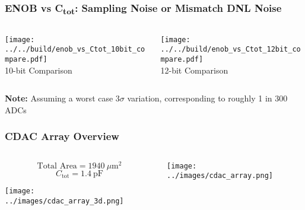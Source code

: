 \documentclass[aspectratio=169]{beamer}
\begin{document}
\begin{frame}
  \frametitle{ENOB vs C\textsubscript{tot}: Sampling Noise or Mismatch DNL Noise}

  \begin{columns}
    \begin{column}{0.5\textwidth}
      \begin{center}
        \texttt{[image: ../../build/enob\_vs\_Ctot\_10bit\_compare.pdf]}
        \\
        \small 10-bit Comparison
      \end{center}
    \end{column}
    \begin{column}{0.5\textwidth}
      \begin{center}
        \texttt{[image: ../../build/enob\_vs\_Ctot\_12bit\_compare.pdf]}
        \\
        \small 12-bit Comparison
      \end{center}
    \end{column}
  \end{columns}
  \begin{center}
    \small
    \textbf{Note:} Assuming a worst case $3\sigma$ variation, corresponding to roughly 1 in 300 ADCs
  \end{center}
\end{frame}





\begin{frame}
  \frametitle{CDAC Array Overview}

  \begin{columns}
    \begin{column}{0.5\textwidth}
      \[
        \text{Total Area} = 1940~\mu\mathrm{m}^2
      \]
      \[
        C_\mathrm{tot} = 1.4~\mathrm{pF}
      \]
      \begin{center}
        \texttt{[image: ../images/cdac\_array\_3d.png]}
      \end{center}
    \end{column}

    \begin{column}{0.5\textwidth}
      \begin{center}
        \texttt{[image: ../images/cdac\_array.png]}
      \end{center}
    \end{column}
  \end{columns}

\end{frame}
\end{document}

